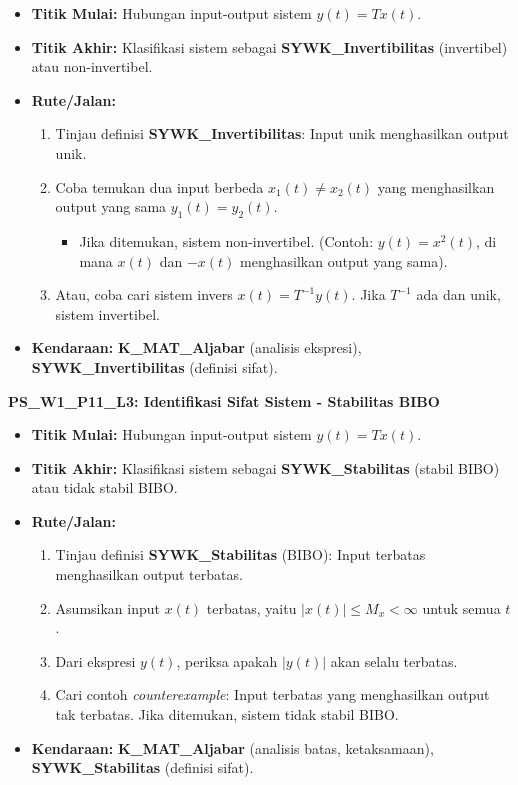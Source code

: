 \documentclass[
  letterpaper,
  DIV=11,
  numbers=noendperiod]{scrreprt}
\providecommand{\tightlist}{%
  \setlength{\itemsep}{0pt}\setlength{\parskip}{0pt}}\usepackage{longtable,booktabs,array}
\begin{document}
\begin{itemize}
\tightlist
\item
  \textbf{Titik Mulai:} Hubungan input-output sistem \(y(t) = T{x(t)}\).
\item
  \textbf{Titik Akhir:} Klasifikasi sistem sebagai
  \textbf{SYWK\_Invertibilitas} (invertibel) atau non-invertibel.
\item
  \textbf{Rute/Jalan:}

  \begin{enumerate}
  \def\labelenumi{\arabic{enumi}.}
  \tightlist
  \item
    Tinjau definisi \textbf{SYWK\_Invertibilitas}: Input unik
    menghasilkan output unik.
  \item
    Coba temukan dua input berbeda \(x_1(t) \neq x_2(t)\) yang
    menghasilkan output yang sama \(y_1(t) = y_2(t)\).

    \begin{itemize}
    \tightlist
    \item
      Jika ditemukan, sistem non-invertibel. (Contoh: \(y(t) = x^2(t)\),
      di mana \(x(t)\) dan \(-x(t)\) menghasilkan output yang sama).
    \end{itemize}
  \item
    Atau, coba cari sistem invers \(x(t) = T^{-1}{y(t)}\). Jika
    \(T^{-1}\) ada dan unik, sistem invertibel.
  \end{enumerate}
\item
  \textbf{Kendaraan:} \textbf{K\_MAT\_Aljabar} (analisis ekspresi),
  \textbf{SYWK\_Invertibilitas} (definisi sifat).
\end{itemize}

\textbf{PS\_W1\_P11\_L3: Identifikasi Sifat Sistem - Stabilitas BIBO}

\begin{itemize}
\tightlist
\item
  \textbf{Titik Mulai:} Hubungan input-output sistem \(y(t) = T{x(t)}\).
\item
  \textbf{Titik Akhir:} Klasifikasi sistem sebagai
  \textbf{SYWK\_Stabilitas} (stabil BIBO) atau tidak stabil BIBO.
\item
  \textbf{Rute/Jalan:}

  \begin{enumerate}
  \def\labelenumi{\arabic{enumi}.}
  \tightlist
  \item
    Tinjau definisi \textbf{SYWK\_Stabilitas} (BIBO): Input terbatas
    menghasilkan output terbatas.
  \item
    Asumsikan input \(x(t)\) terbatas, yaitu \(|x(t)| \le M_x < \infty\)
    untuk semua \(t\).
  \item
    Dari ekspresi \(y(t)\), periksa apakah \(|y(t)|\) akan selalu
    terbatas.
  \item
    Cari contoh \emph{counterexample}: Input terbatas yang menghasilkan
    output tak terbatas. Jika ditemukan, sistem tidak stabil BIBO.
  \end{enumerate}
\item
  \textbf{Kendaraan:} \textbf{K\_MAT\_Aljabar} (analisis batas,
  ketaksamaan), \textbf{SYWK\_Stabilitas} (definisi sifat).
\end{itemize}
\end{document}
